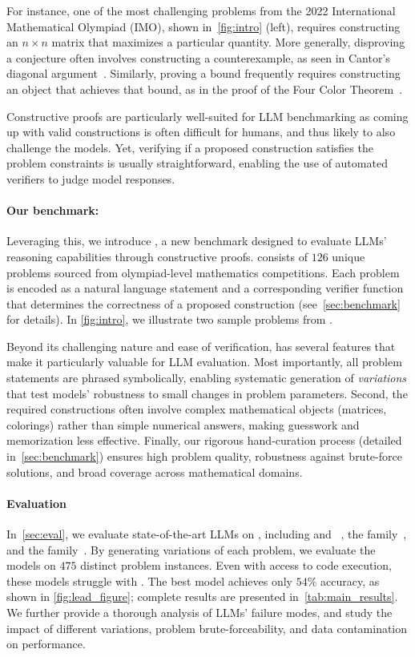 For instance, one of the most challenging problems from the 2022 International Mathematical Olympiad (IMO), shown in~\cref{fig:intro} (left), requires constructing an $n \times n$ matrix that maximizes a particular quantity. More generally, disproving a conjecture often involves constructing a counterexample, as seen in Cantor's diagonal argument~\citep{cantor1890ueber}. Similarly, proving a bound frequently requires constructing an object that achieves that bound, as in the proof of the Four Color Theorem~\citep{appel1989fourcolor}.

Constructive proofs are particularly well-suited for LLM benchmarking as coming up with valid constructions is often difficult for humans, and thus likely to also challenge the models.
Yet, verifying if a proposed construction satisfies the problem constraints is usually straightforward, enabling the use of automated verifiers to judge model responses.

\paragraph{Our benchmark: \mc}
Leveraging this, we introduce \mc, a new benchmark designed to evaluate LLMs' reasoning capabilities through constructive proofs. \mc consists of $126$ unique problems sourced from olympiad-level mathematics competitions. Each problem is encoded as a natural language statement and a corresponding verifier function that determines the correctness of a proposed construction (see~\cref{sec:benchmark} for details). 
In \cref{fig:intro}, we illustrate two sample problems from \mc.

Beyond its challenging nature and ease of verification, \mc has several features that make it particularly valuable for LLM evaluation. 
Most importantly, all problem statements are phrased symbolically, enabling systematic generation of \emph{variations} that test models' robustness to small changes in problem parameters. 
Second, the required constructions often involve complex mathematical objects (\eg matrices, colorings) rather than simple numerical answers, making guesswork and memorization less effective. 
Finally, our rigorous hand-curation process (detailed in~\cref{sec:benchmark}) ensures high problem quality, robustness against brute-force solutions, and broad coverage across mathematical domains.

\paragraph{Evaluation} 
In~\cref{sec:eval}, we evaluate state-of-the-art LLMs on \mc, including \gptfo{} and \othree{}~\citep{openai2024o1}, the \gemini{}  family~\citep{gemini-1.5}, and the \claude{} family~\citep{anthropic2024claude}. 
By generating variations of each problem, we evaluate the models on $475$ distinct problem instances.
Even with access to code execution, these models struggle with \mc. The best model achieves only $54\%$ accuracy, as shown in \cref{fig:lead_figure}; complete results are presented in~\cref{tab:main_results}. We further provide a thorough analysis of LLMs' failure modes, and study the impact of different variations, problem brute-forceability, and data contamination on performance.


